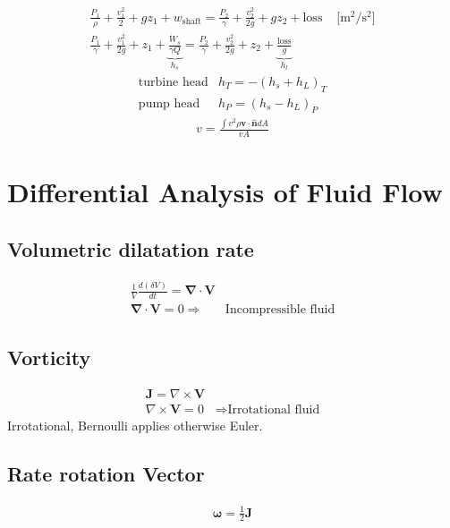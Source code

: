 \documentclass[a4paper]{amsart}
\begin{document}
\begin{eqnarray*}
	\frac{P_1}{\rho}+\frac{v_1^2}{2}+gz_1
	+{w_{\text{shaft}}}
	=\frac{P_2}{\gamma}+\frac{v_2^2}{2g}+gz_2
	+\text{loss}&
	\text{ [m$^2$/s$^2$]}
	\\
	\frac{P_1}{\gamma}+\frac{v_1^2}{2g}+z_1
	+\underbrace{\frac{\dot W_{s}}{\gamma Q}}_{h_s}
	=\frac{P_2}{\gamma}+\frac{v_2^2}{2g}+z_2
	+\underbrace{\frac{\text{loss}}{g}}_{h_l}
\end{eqnarray*}
\begin{eqnarray*}
	\text{turbine head}&h_T=-(h_s+h_L)_T\\
	\text{pump head}&h_P=(h_s-h_L)_P
\end{eqnarray*}
\begin{eqnarray*}
	v=\frac{\int v^2\rho \mathbf{v}\cdot\mathbf{\hat n}dA}{\overline v A}
\end{eqnarray*}


\onecolumn
\newpage
\twocolumn
\section{Differential Analysis of Fluid Flow}
\subsection{Volumetric dilatation rate}
\begin{eqnarray*}
	\frac{1}{V}\frac{d(\delta V)}{dt}=\mathbf{\nabla}\cdot \mathbf{V}
	\\
	\mathbf{\nabla}\cdot \mathbf{V}=0\Rightarrow&\text{Incompressible fluid}
\end{eqnarray*}

\subsection{Vorticity}
\begin{eqnarray*}
	\mathbf{J}=\nabla\times \mathbf{V}&\\
	\nabla\times \mathbf{V}=0&\Rightarrow\text{Irrotational fluid}
\end{eqnarray*}
Irrotational, Bernoulli applies otherwise Euler.

\subsection{Rate rotation Vector}
\begin{eqnarray*}
	\mathbf{\omega}=\frac{1}{2} \mathbf{J}
\end{eqnarray*}
\end{document}
